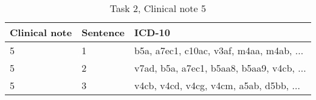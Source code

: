 \begin{table}[!htb] \footnotesize \center
\caption{Task 2, Clinical note 5 \label{tab:t2c5}}
\begin{tabularx}{\textwidth}{l l X}
    \toprule
    Clinical note & Sentence & ICD-10 \\
    \midrule
	 5 & 1 & b5a, a7ec1, c10ac, v3af, m4aa, m4ab, ... \\
	 5 & 2 & v7ad, b5a, a7ec1, b5aa8, b5aa9, v4cb, ... \\
	 5 & 3 & v4cb, v4cd, v4cg, v4cm, a5ab, d5bb, ... \\
	\bottomrule
\end{tabularx}
\end{table}